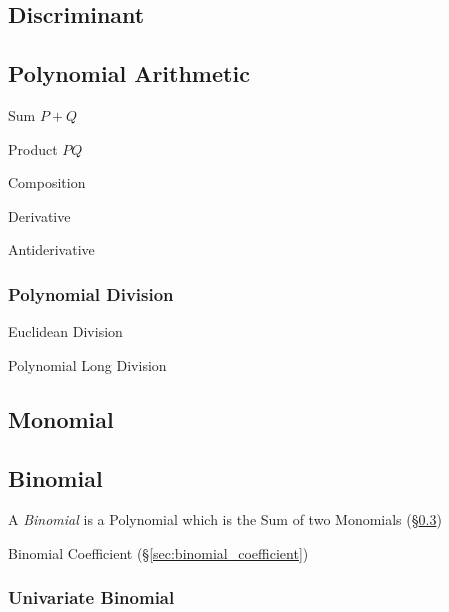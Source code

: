\subsection{Discriminant}\label{sec:discriminant}

\subsection{Polynomial Arithmetic}\label{sec:polynomial_arithmetic}

Sum $P + Q$

Product $P Q$

Composition

Derivative

Antiderivative



\subsubsection{Polynomial Division}\label{sec:polynomial_division}

Euclidean Division

Polynomial Long Division



\subsection{Monomial}\label{sec:monomial}

\subsection{Binomial}\label{sec:binomial}

A \emph{Binomial} is a Polynomial which is the Sum of two Monomials
(\S\ref{sec:monomial})

Binomial Coefficient (\S\ref{sec:binomial_coefficient})



\subsubsection{Univariate Binomial}\label{sec:univariate_binomial}

